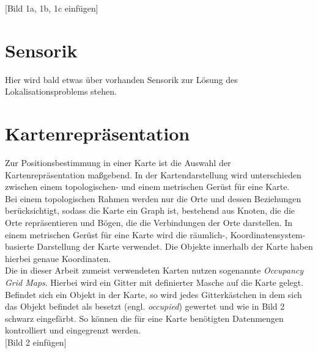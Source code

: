 [Bild 1a, 1b, 1c einfügen]\\




\section{Sensorik}\label{chap:Sensorik}
Hier wird bald etwas über vorhanden Sensorik zur Lösung des Lokalisationsproblems stehen.

\section{Kartenrepräsentation}\label{chap:Kartenrepräsentation}
Zur Positionsbestimmung in einer Karte ist die Auswahl der Kartenrepräsentation maßgebend. In der Kartendarstellung wird unterschieden zwischen einem topologischen- und einem metrischen Gerüst für eine Karte.\\
Bei einem topologischen Rahmen werden nur die Orte und dessen Beziehungen berücksichtigt, sodass die Karte ein Graph ist, bestehend aus Knoten, die die Orte repräsentieren und Bögen, die die Verbindungen der Orte darstellen. In einem metrischen Gerüst für eine Karte wird die räumlich-, Koordinatensystem-basierte Darstellung der Karte verwendet. Die Objekte innerhalb der Karte haben hierbei genaue Koordinaten.\\
Die in dieser Arbeit zumeist verwendeten Karten nutzen sogenannte \textit{Occupancy Grid Maps}. Hierbei wird ein Gitter mit definierter Masche auf die Karte gelegt. Befindet sich ein Objekt in der Karte, so wird jedes Gitterkästchen in dem sich das Objekt befindet als besetzt (engl. \textit{occupied}) gewertet und wie in Bild 2 schwarz eingefärbt. So können die für eine Karte benötigten Datenmengen kontrolliert und eingegrenzt werden.\\

[Bild 2 einfügen]
